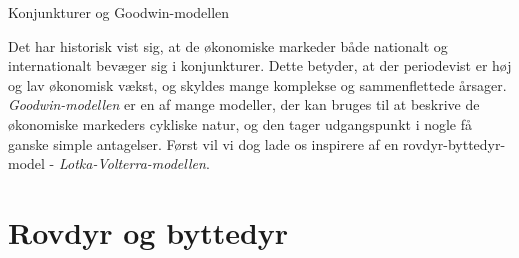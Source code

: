 \documentclass[12pt]{article}
\begin{document}




\begin{center}
	\Huge
	Konjunkturer og Goodwin-modellen
\end{center}

Det har historisk vist sig, at de økonomiske markeder både nationalt og internationalt bevæger sig i konjunkturer. Dette betyder, at der periodevist er høj og lav økonomisk vækst, og skyldes mange komplekse og sammenflettede årsager. \textit{Goodwin-modellen} er en af mange modeller, der kan bruges til at beskrive de økonomiske markeders cykliske natur, og den tager udgangspunkt i nogle få ganske simple antagelser. Først vil vi dog lade os inspirere af en rovdyr-byttedyr-model - \textit{Lotka-Volterra-modellen}.
\section*{Rovdyr og byttedyr}
\end{document}
